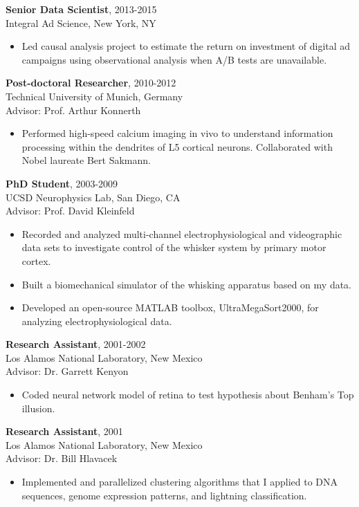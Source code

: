 \documentclass[line,11pt]{res}
\begin{document}
\begin{resume}
 {\bf Senior Data Scientist}, 2013-2015 \\ Integral Ad Science, New York, NY 
  \begin{itemize}
          \item[] Led causal analysis project to estimate the return on investment of digital ad campaigns using observational analysis when A/B tests are unavailable.
   \end{itemize}
   
 {\bf Post-doctoral Researcher}, 2010-2012 \\ Technical University of Munich, Germany 
 \\ Advisor: Prof. Arthur Konnerth
  \begin{itemize}
        \item[] Performed high-speed calcium imaging in vivo to understand information processing within the dendrites of L5 cortical neurons.  Collaborated with Nobel laureate Bert Sakmann.
  \end{itemize}
    
{\bf PhD Student}, 2003-2009 \\ UCSD Neurophysics Lab, San Diego, CA \\ Advisor: Prof. David Kleinfeld
  \begin{itemize}
        \item[] Recorded and analyzed multi-channel electrophysiological and videographic data sets to investigate control of the whisker system by primary motor cortex.
        \item[] Built a biomechanical simulator of the whisking apparatus based on my data.
        \item[] Developed an open-source MATLAB toolbox, UltraMegaSort2000, for analyzing electrophysiological data. 
  \end{itemize}

   {\bf Research Assistant}, 2001-2002 \\ Los Alamos National Laboratory, New Mexico  
   \\ Advisor: Dr. Garrett Kenyon
  \begin{itemize}
        \item[] Coded neural network model of retina to test hypothesis about Benham's Top illusion.
  \end{itemize}

   {\bf Research Assistant}, 2001 \\ Los Alamos National Laboratory, New Mexico  
   \\ Advisor: Dr. Bill Hlavacek
  \begin{itemize}
  \item[] Implemented and parallelized clustering algorithms that I applied to DNA sequences, genome expression patterns, and lightning classification. 
  \end{itemize}


\end{resume}
\end{document}

